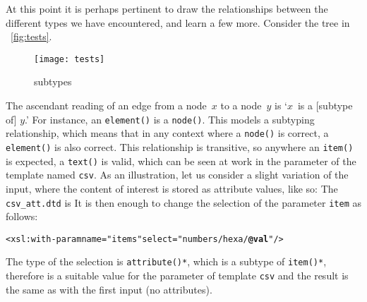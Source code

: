 At this point it is perhaps pertinent to draw the relationships
between the different types we have encountered, and learn a few
more. Consider the tree in \fig~\vref{fig:tests}.
\begin{figure}
\centering
\texttt{[image: tests]}
\caption{\XPath subtypes\label{fig:tests}}
\end{figure}
The ascendant reading of an edge from a node~\(x\) to a node~\(y\) is
`\(x\)~is a [subtype of] \(y\).' For instance, an \texttt{element()}
is a \texttt{node()}. This models a subtyping relationship, which
means that in any context where a \texttt{node()} is correct, a
\texttt{element()} is also correct. This relationship is transitive,
so anywhere an \texttt{item()} is expected, a \texttt{text()} is
valid, which can be seen at work in the parameter of the template
named \texttt{csv}. As an illustration, let us consider a slight
variation of the input, where the content of interest is stored as
attribute values, like so:
\noindent The \DTD \texttt{csv\_att.dtd} is
\noindent It is then enough to change the selection of the parameter
\texttt{item} as follows:
\begin{alltt}
      <xsl:with-param name="items" select="numbers/hexa/\textbf{@val}"/>
\end{alltt}
The type of the selection is \texttt{attribute()*}, which is a
subtype of \texttt{item()*}, therefore is a suitable value for the
parameter of template \texttt{csv} and the result is the same as with
the first \XML input (no attributes).

